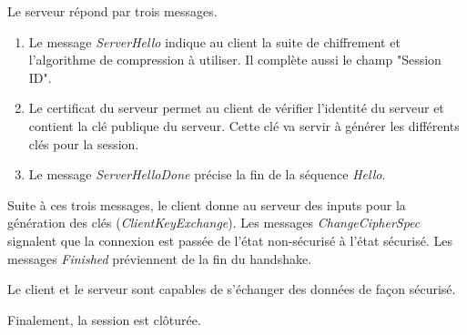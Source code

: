 Le serveur répond par trois messages.
\begin{enumerate}
	\item Le message \textit{ServerHello} indique au client la suite de chiffrement et l'algorithme de compression à utiliser. Il complète aussi le champ "Session ID". 
	\item Le certificat du serveur permet au client de vérifier l'identité du serveur et contient la clé publique du serveur. Cette clé va servir à générer les différents clés pour la session.
	\item Le message \textit{ServerHelloDone} précise la fin de la séquence \textit{Hello}.
\end{enumerate}
Suite à ces trois messages, le client donne au serveur des inputs pour la génération des clés (\textit{ClientKeyExchange}).
Les messages \textit{ChangeCipherSpec} signalent que la connexion est passée de l'état non-sécurisé à l'état sécurisé. 
Les messages \textit{Finished} préviennent de la fin du handshake.
 
Le client et le serveur sont capables de s'échanger des données de façon sécurisé. 

Finalement, la session est clôturée.